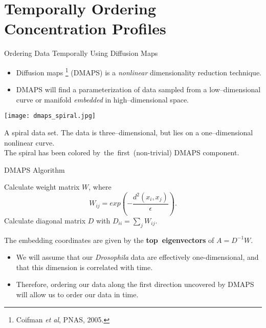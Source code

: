 \section[Temporally Ordering Concentration Profiles]{Temporally Ordering Concentration Profiles}

\begin{frame}{Ordering Data Temporally Using Diffusion Maps}

\begin{itemize}
\item Diffusion maps \footnote{ \tiny Coifman {\em et al}, PNAS, 2005.} (DMAPS) is a {\em nonlinear} dimensionality reduction technique.
\item DMAPS will find a parameterization of data sampled from a low--dimensional curve or manifold {\em embedded} in high--dimensional space.
\end{itemize}

	\begin{minipage}{0.45\textwidth}
	\centering
		\texttt{[image: dmaps\_spiral.jpg]}\\
		\centering
		{\scriptsize A spiral data set. The data is three--dimensional, but lies on a one--dimensional nonlinear curve. \\
		The spiral has been colored by~the~first~(non-trivial) DMAPS component. \par}
	\end{minipage}
	\hfill
	\begin{minipage}{0.5\textwidth}
		\begin{block}{DMAPS Algorithm}
		{\scriptsize 
		Calculate weight matrix $W$, where
		$$W_{ij} = exp\left( -\frac{d^2(x_i, x_j)}{\epsilon} \right).$$
		Calculate diagonal matrix $D$ with $D_{ii} = \sum_j W_{ij}.$
		
		The embedding coordinates are given by the {\bf top~eigenvectors} of $A=D^{-1}W$.
		\par}
	\end{block}
	\end{minipage}


{\small
\begin{itemize}
\item We will assume that our {\em Drosophila} data are effectively one-dimensional, and that this dimension is correlated with time. 
%
\item Therefore, ordering our data along the first direction uncovered by DMAPS will allow us to order our data in time. 
\end{itemize}
\par}

\end{frame}

